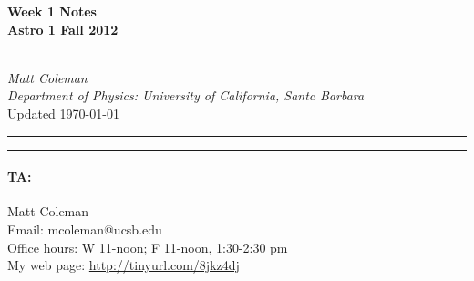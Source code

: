 \documentclass{article}
\begin{document}
\cfoot{\thepage}

\begin{centering}
	
	\begin{large}\textbf{Week 1 Notes\\
	Astro 1 Fall 2012}\end{large}\vspace{7pt}\\
	\textit{Matt Coleman \\
	Department of Physics: University of California, Santa Barbara}\vspace{5pt}\\
	Updated \today\vspace{14pt}
	
\end{centering}	

\hrule\vspace{2pt} \hrule
\paragraph*{TA:}Matt Coleman\\
Email: mcoleman@ucsb.edu\\
Office hours: W 11-noon; F 11-noon, 1:30-2:30 pm\\
My web page: \url{http://tinyurl.com/8jkz4dj}\\


\end{document}
